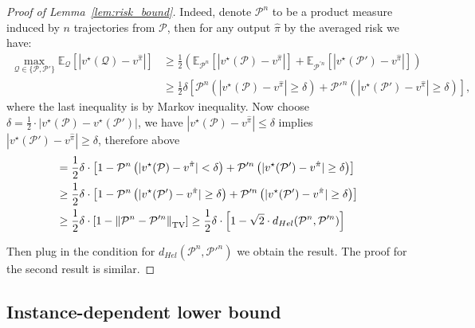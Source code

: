 \begin{proof}[Proof of Lemma~\ref{lem:risk_bound}]
	Indeed, denote $\mathcal{P}^n$ to be a product measure induced by $n$ trajectories from $\mathcal{P}$, then for any output $\hat{\pi}$ by the averaged risk we have:
	\begin{align*}
		\max_{\mathcal{Q}\in\{\mathcal{P},\mathcal{P}'\}}\mathbb{E}_\mathcal{Q}\left[|v^\star(\mathcal{Q})-v^{\hat{\pi}}|\right]&\geq \frac{1}{2}\left(\mathbb{E}_{\mathcal{P}^n}\left[|v^\star(\mathcal{P})-v^{\hat{\pi}}|\right]+\mathbb{E}_{\mathcal{P}^{'n}}\left[|v^\star(\mathcal{P}')-v^{\hat{\pi}}|\right]\right)\\
		&\geq \frac{1}{2}\delta\left[\mathcal{P}^n\left(|v^\star(\mathcal{P})-v^{\hat{\pi}}|\geq\delta\right)+\mathcal{P}'^n\left(|v^\star(\mathcal{P}')-v^{\hat{\pi}}|\geq\delta\right)\right],
	\end{align*}
	where the last inequality is by Markov inequality. Now choose $\delta = \frac{1}{2}\cdot |v^\star(\mathcal{P})-v^\star(\mathcal{P}')|$, we have $|v^\star(\mathcal{P})-v^{\hat{\pi}}|\leq \delta$ implies $|v^\star(\mathcal{P}')-v^{\hat{\pi}}|\geq \delta$, therefore above 
	\begin{equation}\label{eqn:Hel_final}
	\begin{aligned}
	&= \frac{1}{2}\delta\cdot\left[1-\mathcal{P}^n\left(|v^\star(\mathcal{P})-v^{\hat{\pi}}|<\delta\right)+\mathcal{P}'^n\left(|v^\star(\mathcal{P}')-v^{\hat{\pi}}|\geq\delta\right)\right]\\
	&\geq \frac{1}{2}\delta\cdot\left[1-\mathcal{P}^n\left(|v^\star(\mathcal{P}')-v^{\hat{\pi}}|\geq\delta\right)+\mathcal{P}'^n\left(|v^\star(\mathcal{P}')-v^{\hat{\pi}}|\geq\delta\right)\right]\\
	&\geq \frac{1}{2}\delta\cdot \left[1-\left\lVert\mathcal{P}^n-\mathcal{P}'^n\right\rVert_{\mathrm{TV}}\right]\geq \frac{1}{2}\delta\cdot\left[1-\sqrt{2} \cdot d_{Hel}(\mathcal{P}^n,\mathcal{P}'^n)\right]
	\end{aligned}
	\end{equation}
	
	Then plug in the condition for $d_{Hel}(\mathcal{P}^n,\mathcal{P}'^n)$ we obtain the result. The proof for the second result is similar.
	
\end{proof}


\subsection{Instance-dependent lower bound}

